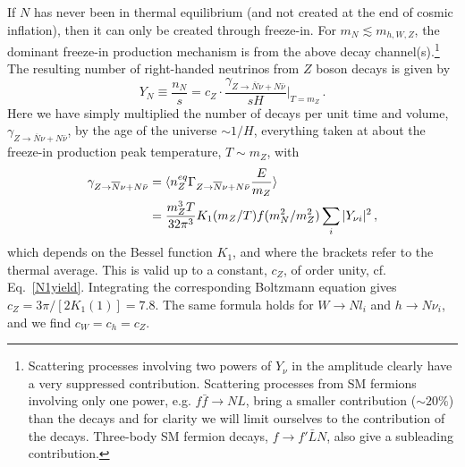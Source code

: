 \documentclass[prd,a4paper,twocolumn,preprintnumbers,nofootinbib,superscriptaddress]{revtex4}
\begin{document}
If $N$ has never been in thermal equilibrium (and not created at the end of cosmic inflation), then it can only be created through freeze-in. For $m_{N}\lesssim m_{h,W,Z}$, the dominant freeze-in production mechanism is from the above decay channel(s).\footnote{Scattering processes involving two powers of $Y_\nu$ in the amplitude clearly have a very suppressed contribution. Scattering processes from SM fermions involving only one power, e.g. $f\bar{f} \rightarrow N L$,  bring a smaller contribution ($\sim 20\%$) than the decays and for clarity we will limit ourselves to the contribution of the decays. Three-body SM fermion decays, $f\rightarrow {f}' \bar{L} N$, also give a subleading contribution.}
The resulting number of right-handed neutrinos from $Z$ boson decays is given by
\begin{equation}
	Y_{N}\equiv\frac{n_{N}}{s}= c_Z \cdot \frac{\gamma_{Z\rightarrow \overline{N} \nu+N\bar{\nu}}}{sH} \Big|_{T=m_Z} \, .
	\label{N1yield}
\end{equation}
Here we have simply multiplied the 
number of decays per unit time and volume, $\gamma_{Z\rightarrow \overline{N} \nu+N\bar{\nu}}$, by the age of the universe $\sim 1/H$, everything taken at about the freeze-in production peak temperature, $T\sim m_Z$, with
\begin{align}
	\gamma_{Z\rightarrow \overline{N} \nu+N\bar{\nu}}&=\langle n_{Z}^{eq}\Gamma_{Z\rightarrow \overline{N} \nu+N\bar{\nu}}\frac{E}{m_{Z}}\rangle \notag \\
	&=  \frac{m_Z^3 T}{32\pi^3} K_1(m_Z/T) f(m_N^2/m_Z^2) \sum_i |Y_{\nu i}|^2 \, , 
\end{align}
which depends on the Bessel function $K_1$, and where the brackets refer to the thermal average. 
This is valid up to a constant, $c_Z$, of order unity, cf. Eq.~\eqref{N1yield}. 
Integrating the corresponding Boltzmann equation gives $c_Z=3\pi/[2K_1(1)] = 7.8$.
The same formula holds for $W\rightarrow N l_i$ and $h\rightarrow N \nu_i$, and we find $c_W=c_h=c_Z$.
	
\end{document}
